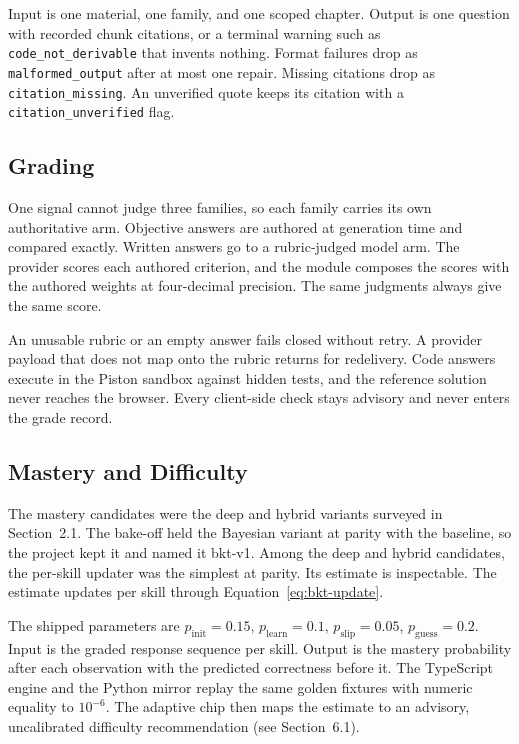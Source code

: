 Input is one material, one family, and one scoped chapter. Output is one question with recorded chunk citations, or a terminal warning such as \texttt{code\_not\_derivable} that invents nothing. Format failures drop as \texttt{malformed\_output} after at most one repair. Missing citations drop as \texttt{citation\_missing}. An unverified quote keeps its citation with a \texttt{citation\_unverified} flag.

\subsection{Grading}
One signal cannot judge three families, so each family carries its own authoritative arm. Objective answers are authored at generation time and compared exactly. Written answers go to a rubric-judged model arm. The provider scores each authored criterion, and the module composes the scores with the authored weights at four-decimal precision. The same judgments always give the same score.

An unusable rubric or an empty answer fails closed without retry. A provider payload that does not map onto the rubric returns for redelivery. Code answers execute in the Piston sandbox against hidden tests, and the reference solution never reaches the browser. Every client-side check stays advisory and never enters the grade record.

\subsection{Mastery and Difficulty}
The mastery candidates were the deep and hybrid variants surveyed in Section~2.1. The bake-off held the Bayesian variant at parity with the baseline, so the project kept it and named it bkt-v1. Among the deep and hybrid candidates, the per-skill updater was the simplest at parity. Its estimate is inspectable. The estimate updates per skill through Equation~\ref{eq:bkt-update}.

The shipped parameters are $p_{\text{init}} = 0.15$, $p_{\text{learn}} = 0.1$, $p_{\text{slip}} = 0.05$, $p_{\text{guess}} = 0.2$. Input is the graded response sequence per skill. Output is the mastery probability after each observation with the predicted correctness before it. The TypeScript engine and the Python mirror replay the same golden fixtures with numeric equality to $10^{-6}$. The adaptive chip then maps the estimate to an advisory, uncalibrated difficulty recommendation (see Section~6.1).

